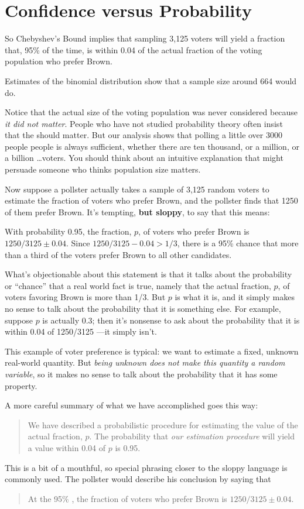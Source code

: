 \section{Confidence versus Probability}

So Chebyshev's Bound implies that sampling 3,125 voters will yield a
fraction that, 95\% of the time, is within 0.04 of the actual fraction
of the voting population who prefer Brown.  \begin{editingnotes}
  Estimates of the binomial distribution show that a sample size
  around 664 would do.
\end{editingnotes}

Notice that the actual size of the voting population was never
considered because \emph{it did not matter}.  People who have not
studied probability theory often insist that the 
should matter.  But our analysis shows that polling a little over 3000
people people is always sufficient, whether there are ten thousand, or
a million, or a billion \dots voters.  You should think about an intuitive
explanation that might persuade someone who thinks population size
matters.

Now suppose a pollster actually takes a sample of 3,125 random voters to
estimate the fraction of voters who prefer Brown, and the pollster finds
that 1250 of them prefer Brown.  It's tempting, \textbf{but sloppy}, to
say that this means:
\begin{falseclm*}
  With probability 0.95, the fraction, $p$, of voters who prefer Brown
  is $1250/3125 \pm 0.04$.  Since $1250/3125 -0.04 > 1/3$, there is a 95\%
  chance that more than a third of the voters prefer Brown to all other
  candidates.
\end{falseclm*}
What's objectionable about this statement is that it talks about the
probability or ``chance'' that a real world fact is true, namely that the
actual fraction, $p$, of voters favoring Brown is more than 1/3.  But $p$
is what it is, and it simply makes no sense to talk about the probability
that it is something else.  For example, suppose $p$ is actually 0.3;
then it's nonsense to ask about the probability that it is within 0.04 of
1250/3125 ---it simply isn't.

This example of voter preference is typical: we want to estimate a fixed,
unknown real-world quantity.  But \emph{being unknown does not make this
  quantity a random variable}, so it makes no sense to talk about the
probability that it has some property.

A more careful summary of what we have accomplished goes this way:
\begin{quote}
We have described a probabilistic procedure for estimating the value of
the actual fraction, $p$.  The probability that \emph{our estimation
procedure} will yield a value within 0.04 of $p$ is 0.95.
\end{quote}
This is a bit of a mouthful, so special phrasing closer to the sloppy
language is commonly used.  The pollster would describe his conclusion by
saying that
\begin{quote}
At the 95\% , the fraction of voters
who prefer Brown is $1250/3125 \pm 0.04$.
\end{quote}

